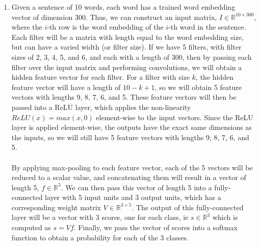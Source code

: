 \documentclass[a4paper]{article}
\begin{document}
\begin{enumerate}

\item{
Given a sentence of 10 words, each word has a trained word embedding vector of dimension 300. Thus, we can construct an input matrix, $I \in \mathbb{R}^{10 \times 300}$, where the $i$-th row is the word embedding of the $i$-th word in the sentence. Each filter will be a matrix with length equal to the word embedding size, but can have a varied width (or filter size). If we have 5 filters, with filter sizes of 2, 3, 4, 5, and 6, and each with a length of 300, then by passing each filter over the input matrix and performing convolutions, we will obtain a hidden feature vector for each filter. For a filter with size $k$, the hidden feature vector will have a length of $10-k+1$, so we will obtain 5 feature vectors with lengths 9, 8, 7, 6, and 5. These feature vectors will then be passed into a ReLU layer, which applies the non-linearity $ReLU(x) = max(x,0)$ element-wise to the input vectors. Since the ReLU layer is applied element-wise, the outputs have the exact same dimensions as the inputs, so we will still have 5 feature vectors with lengths 9, 8, 7, 6, and 5.
\\\\By applying max-pooling to each feature vector, each of the 5 vectors will be reduced to a scalar value, and concatenating them will result in a vector of length 5, $f \in \mathbb{R}^5$. We can then pass this vector of length 5 into a fully-connected layer with 5 input units and 3 output units, which has a corresponding weight matrix $V \in \mathbb{R}^{3 \times 5}$. The output of this fully-connected layer will be a vector with 3 scores, one for each class, ie $s \in \mathbb{R}^{3}$ which is computed as $s = Vf$. Finally, we pass the vector of scores into a softmax function to obtain a probability for each of the 3 classes. 
}


\end{enumerate}
\end{document}
